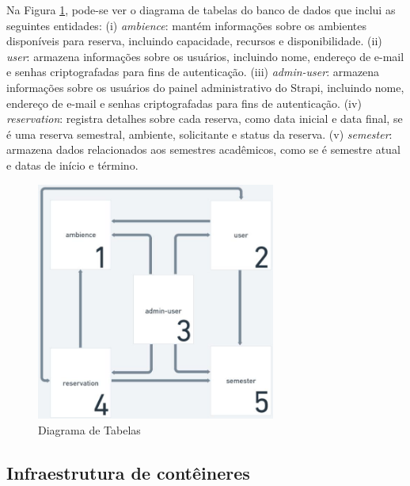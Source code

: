\documentclass[12pt]{article}
\begin{document}
Na Figura \ref{fig:tabelas}, pode-se ver o diagrama de tabelas do banco de dados que inclui as seguintes entidades: (i) \textit{ambience}: mantém informações sobre os ambientes disponíveis para reserva, incluindo capacidade, recursos e disponibilidade. (ii) \textit{user}: armazena informações sobre os usuários, incluindo nome, endereço de e-mail e senhas criptografadas para fins de autenticação. (iii) \textit{admin-user}: armazena informações sobre os usuários do painel administrativo do Strapi, incluindo nome, endereço de e-mail e senhas criptografadas para fins de autenticação. (iv) \textit{reservation}: registra detalhes sobre cada reserva, como data inicial e data final, se é uma reserva semestral,  ambiente, solicitante e status da reserva. (v) \textit{semester}: armazena dados relacionados aos semestres acadêmicos, como se é semestre atual e datas de início e término.

\begin{figure}[ht]
\centering
\includegraphics[width=0.7\textwidth]{tabelas.jpg}
\caption{Diagrama de Tabelas}
\label{fig:tabelas}
\end{figure}

\subsection{Infraestrutura de contêineres} \label{sec:conteineres}
\end{document}
